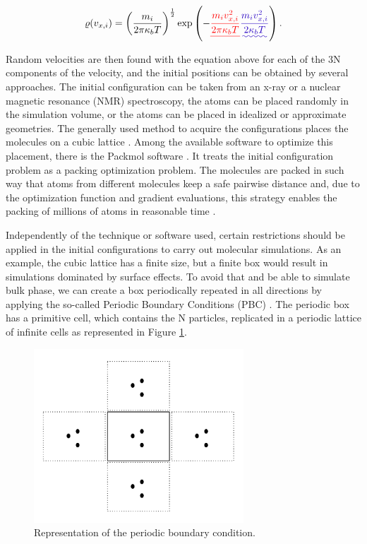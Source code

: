 \documentclass[
	12pt,				%
	openany,			%
	oneside,			%
	a4paper,			%
	english,			%
	brazil				%
	]{abntex2}
\providecommand{\DIFadd}[1]{{\protect\color{blue}\uwave{#1}}}
\providecommand{\DIFdel}[1]{{\protect\color{red}\sout{#1}}}
\providecommand{\DIFaddbegin}{}
\providecommand{\DIFaddend}{}
\providecommand{\DIFdelbegin}{}
\providecommand{\DIFdelend}{}
\providecommand{\DIFadd}[1]{{\protect\color{blue}\uwave{#1}}} %
\providecommand{\DIFdel}[1]{{\protect\color{red}\sout{#1}}}                      %
\providecommand{\DIFaddbegin}{} %
\providecommand{\DIFaddend}{} %
\providecommand{\DIFdelbegin}{} %
\providecommand{\DIFdelend}{} %
\begin{document}
\begin{equation}
\varrho (v_{x,i}) = \left (\frac{m_{i}}{2 \pi \kappa_{b} T} \right )^{\frac{1}{2}} \exp \left (-\DIFdelbegin \DIFdel{\frac{m_{i}v_{x,i}^2}{2 \pi \kappa_{b} T} }\DIFdelend \DIFaddbegin \DIFadd{\frac{m_{i}v_{x,i}^2}{2 \kappa_{b} T} }\DIFaddend \right) .
\end{equation}

Random velocities are then found with the equation above for each of the 3N components of the velocity, and the initial positions can be obtained by several approaches. The initial configuration can be taken from an x-ray or a nuclear magnetic resonance (NMR) spectroscopy, the atoms can be placed randomly in the simulation volume, or the atoms can be placed in idealized or approximate geometries. The generally used method to acquire the configurations places the molecules on a cubic lattice \cite{shell2015}.  Among the available software to optimize this placement, there is the Packmol software \cite{packmol}. It treats the initial configuration problem as a packing optimization problem. The molecules are packed in such way that atoms from different molecules keep a safe pairwise distance and, due to the optimization function and gradient evaluations, this strategy enables the packing of millions of atoms in reasonable time \cite{packmol}.   

Independently of the technique or software used, certain restrictions should be applied in the initial configurations to carry out molecular simulations. As an example, the cubic lattice has a finite size, but a finite box would result in simulations dominated by surface effects. To avoid that and be able to simulate bulk phase, we can create a box periodically repeated in all directions by applying the so-called Periodic Boundary Conditions (PBC) \cite{frenkel}. The periodic box has a primitive cell, which contains the N particles, replicated in a periodic lattice of infinite cells as represented in Figure \ref{fig:pbc}. 

\begin{figure}[h]
	\centering
	\includegraphics[width=0.7\textwidth]{Figures/pbc}
	\caption{Representation of the periodic boundary condition.}
	\label{fig:pbc}
\end{figure}
\DIFdelbegin %
\end{document}
